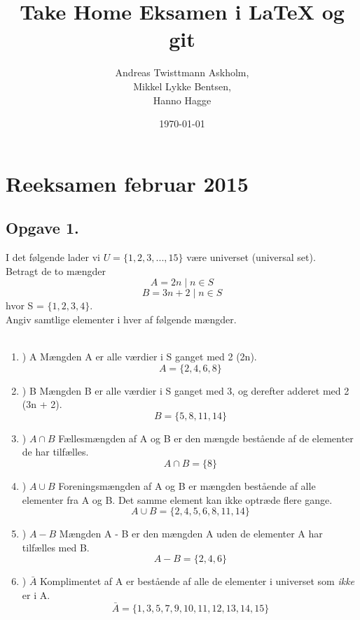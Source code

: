 \documentclass[a4paper,12pt]{article}
\title{Take Home Eksamen i \LaTeX{} og git}
\author{Andreas Twisttmann Askholm, \\Mikkel Lykke Bentsen, \\Hanno Hagge}
\date{\today}
\begin{document}
\maketitle
\renewcommand{\labelenumi}{\alph{enumi}}
\renewcommand{\labelenumii}{\arabic{enumii}}
\section{Reeksamen februar 2015}
\subsection{Opgave 1.}
I det følgende lader vi $U = \lbrace1, 2, 3, . . . , 15\rbrace$ være universet (universal set).\\
Betragt de to mængder\\
$$A = {2n \mid n \in S}$$
$$B = {3n + 2 \mid n \in S}$$
hvor S = $\lbrace1, 2, 3, 4\rbrace.$ \\
Angiv samtlige elementer i hver af følgende mængder.
\\\\
\begin{enumerate}


\item) A  \hspace{5mm} Mængden A er alle værdier i  S ganget med 2 (2n).$$ A = \lbrace 2, 4, 6, 8\rbrace$$
\item) B \hspace{5mm} Mængden B er alle værdier i S ganget med 3, og derefter adderet med 2 (3n + 2). $$ B = \lbrace 5, 8, 11, 14 \rbrace$$
\item) $A \cap B$ \hspace{5mm} Fællesmængden af A og B er den mængde bestående af de elementer de har tilfælles. $$ A \cap B = \lbrace8\rbrace$$
\item) $A \cup B$ \hspace{5mm} Foreningsmængden af A og B er mængden bestående af alle elementer fra A og B. Det samme element kan ikke optræde flere gange. $$ A \cup B = \lbrace 2, 4, 5, 6, 8, 11, 14\rbrace$$
\item) $A - B$ \hspace{5mm} Mængden A - B er den mængden A uden de elementer A har tilfælles med B. $$ A - B = \lbrace 2, 4, 6 \rbrace $$
\item) $ \bar{A}$ \hspace{5mm} Komplimentet af A er bestående af alle de elementer i universet som \emph{ikke} er i A. $$ \bar{A} = \lbrace 1, 3, 5, 7, 9, 10, 11, 12, 13, 14, 15 \rbrace$$
\end{enumerate}
\end{document}
